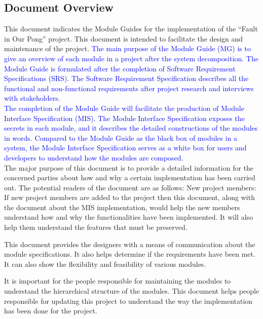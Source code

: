\documentclass[12pt,letterpaper]{article}
\begin{document}
	\subsection{Document Overview}

	\indent This document indicates the Module Guides for the implementation of the “Fault in Our Pong” project. This document is intended to facilitate the design and maintenance of the project. \textcolor{blue}{The main purpose of the Module Guide (MG) is to give an overview of each module in a project after the system decomposition. The Module Guide is formulated after the completion of Software Requirement Specifications (SRS). The Software Requirement Specification describes all the functional and non-functional requirements after project research and interviews with stakeholders.}\\

\textcolor{blue}{The completion of the Module Guide will facilitate the production of Module Interface Specification (MIS). The Module Interface Specification exposes the secrets in each module, and it describes the detailed constructions of the modules in words. Compared to the Module Guide as the black box of modules in a system, the Module Interface Specification serves as a white box for users and developers to understand how the modules are composed. }\\

	The major purpose of this document is to provide a detailed information for the concerned parties about how and why a certain implementation has been carried out. The potential readers of the document are as follows:
New project members: If new project members are added to the project then this document, along with the document about the MIS implementation, would help the new members understand how and why the functionalities have been implemented. It will also help them understand the features that must be preserved.

	This document provides the designers with a means of communication about the module specifications. It also helps determine if the requirements have been met. It can also show the flexibility and feasibility of various modules. 

	It is important for the people responsible for maintaining the modules to understand the hierarchical structure of the modules. This document helps people responsible for updating this project to understand the way the implementation has been done for the project.
\end{document}
